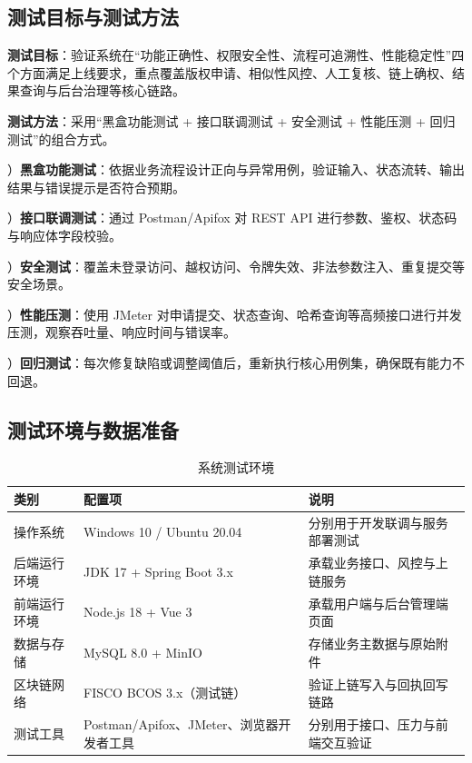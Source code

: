 \documentclass[UTF8,a4paper,12pt]{ctexart}
\begin{document}
\subsection{测试目标与测试方法}
\indent\textbf{测试目标}：验证系统在“功能正确性、权限安全性、流程可追溯性、性能稳定性”四个方面满足上线要求，重点覆盖版权申请、相似性风控、人工复核、链上确权、结果查询与后台治理等核心链路。\par
\indent\textbf{测试方法}：采用“黑盒功能测试 + 接口联调测试 + 安全测试 + 性能压测 + 回归测试”的组合方式。\par
{}）\textbf{黑盒功能测试}：依据业务流程设计正向与异常用例，验证输入、状态流转、输出结果与错误提示是否符合预期。\par
{}）\textbf{接口联调测试}：通过 Postman/Apifox 对 REST API 进行参数、鉴权、状态码与响应体字段校验。\par
{}）\textbf{安全测试}：覆盖未登录访问、越权访问、令牌失效、非法参数注入、重复提交等安全场景。\par
{}）\textbf{性能压测}：使用 JMeter 对申请提交、状态查询、哈希查询等高频接口进行并发压测，观察吞吐量、响应时间与错误率。\par
{}）\textbf{回归测试}：每次修复缺陷或调整阈值后，重新执行核心用例集，确保既有能力不回退。\par

\subsection{测试环境与数据准备}
\begin{table}[H]
  \centering
  \caption{系统测试环境}
  \begin{tabularx}{0.96\textwidth}{l l Y}
    \toprule
    类别 & 配置项 & 说明 \\
    \midrule
    操作系统 & Windows 10 / Ubuntu 20.04 & 分别用于开发联调与服务部署测试 \\
    后端运行环境 & JDK 17 + Spring Boot 3.x & 承载业务接口、风控与上链服务 \\
    前端运行环境 & Node.js 18 + Vue 3 & 承载用户端与后台管理端页面 \\
    数据与存储 & MySQL 8.0 + MinIO & 存储业务主数据与原始附件 \\
    区块链网络 & FISCO BCOS 3.x（测试链） & 验证上链写入与回执回写链路 \\
    测试工具 & Postman/Apifox、JMeter、浏览器开发者工具 & 分别用于接口、压力与前端交互验证 \\
    \bottomrule
  \end{tabularx}
\end{table}
\end{document}

